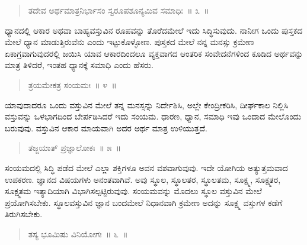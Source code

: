\vspace{-0.2cm}

\begin{verse}
ತದೇವ ಅರ್ಥಮಾತ್ರನಿರ್ಭಾಸಂ ಸ್ವರೂಪಶೂನ್ಯಮಿವ ಸಮಾಧಿಃ~॥ ೩~॥
\end{verse}

\vspace{-0.3cm}


ಧ್ಯಾನದಲ್ಲಿ ಆಕಾರ ಅಥವಾ ಬಾಹ್ಯವಸ್ತುವಿನ ರೂಪವನ್ನು ತೊರೆದಮೇಲೆ ಇದು ಸಿದ್ಧಿಸುವುದು. ನಾನೀಗ ಒಂದು ಪುಸ್ತಕದ ಮೇಲೆ ಧ್ಯಾನ ಮಾಡುತ್ತಿರುವೆನು ಎಂದು ಇಟ್ಟುಕೊಳ್ಳೋಣ. ಪುಸ್ತಕದ ಮೇಲೆ ನನ್ನ ಮನಸ್ಸು ಕ್ರಮೇಣ ಏಕಾಗ್ರವಾಗುವುದರಲ್ಲಿ ಜಯಿಸಿ ಯಾವ ಆಕಾರದಿಂದಲೂ ವ್ಯಕ್ತವಾಗದ ಆಂತರಿಕ ಸಂವೇದನೆಗಳಿಂದ ಕೂಡಿದ ಅರ್ಥವನ್ನು ಮಾತ್ರ ತಿಳಿದರೆ, ಇಂತಹ ಧ್ಯಾನಕ್ಕೆ ಸಮಾಧಿ ಎಂದು ಹೆಸರು. 

\vspace{-0.2cm}

\begin{verse}
ತ್ರಯಮೇಕತ್ರ ಸಂಯಮಃ~॥ ೪~॥
\end{verse}

\vspace{-0.3cm}


ಯಾವುದಾದರೂ ಒಂದು ವಸ್ತುವಿನ ಮೇಲೆ ತನ್ನ ಮನಸ್ಸನ್ನು ನಿರ್ದೇಶಿಸಿ, ಅಲ್ಲೇ ಕೇಂದ್ರೀಕರಿಸಿ, ದೀರ್ಘಕಾಲ ನಿಲ್ಲಿಸಿ ವಸ್ತುವನ್ನು ಒಳಭಾಗದಿಂದ ಬೇರ್ಪಡಿಸಿದರೆ ಇದು ಸಂಯಮ. ಧಾರಣ, ಧ್ಯಾನ, ಸಮಾಧಿ ಇವು ಒಂದಾದ ಮೇಲೊಂದು ಬರುವುವು. ವಸ್ತುವಿನ ಆಕಾರ ಮಾಯವಾಗಿ ಅದರ ಅರ್ಥ ಮಾತ್ರ ಉಳಿಯುತ್ತದೆ. 

\vspace{-0.2cm}

\begin{verse}
ತಜ್ಜಯಾತ್​ ಪ್ರಜ್ಞಾಲೋಕಃ~॥ ೫~॥
\end{verse}

\vspace{-0.3cm}


\eject

ಸಂಯಮದಲ್ಲಿ ಸಿದ್ಧಿ ಪಡೆದ ಮೇಲೆ ಎಲ್ಲಾ ಶಕ್ತಿಗಳೂ ಅವನ ವಶವಾಗುವುವು. ಇದೇ ಯೋಗಿಯ ಅತ್ಯುತ್ತಮವಾದ ಉಪಕರಣ. ಜ್ಞಾನದ ವಿಷಯಗಳು ಅನಂತವಾಗಿವೆ. ಅವು ಸ್ಥೂಲ, ಸ್ಥೂಲತರ, ಸ್ಥೂಲತಮ, ಸೂಕ್ಷ್ಮ, ಸೂಕ್ಷ್ಮತರ, ಸೂಕ್ಷ್ಮತಮ ಇತ್ಯಾದಿಯಾಗಿ ವಿಭಾಗಿಸಲ್ಪಟ್ಟಿರುವುವು. ಸಂಯಮವನ್ನು ಮೊದಲು ಸ್ಥೂಲ ವಸ್ತುವಿನ ಮೇಲೆ ಪ್ರಯೋಗಿಸಬೇಕು. ಸ್ಥೂಲವಸ್ತುವಿನ ಜ್ಞಾನ ಬಂದಮೇಲೆ ನಿಧಾನವಾಗಿ ಕ್ರಮೇಣ ಅದನ್ನು ಸೂಕ್ಷ್ಮ ವಸ್ತುಗಳ ಕಡೆಗೆ ತಿರುಗಿಸಬೇಕು. 

\vspace{-0.2cm}

\begin{verse}
ತಸ್ಯ ಭೂಮಿಷು ವಿನಿಯೋಗಃ~॥ ೬~॥
\end{verse}

